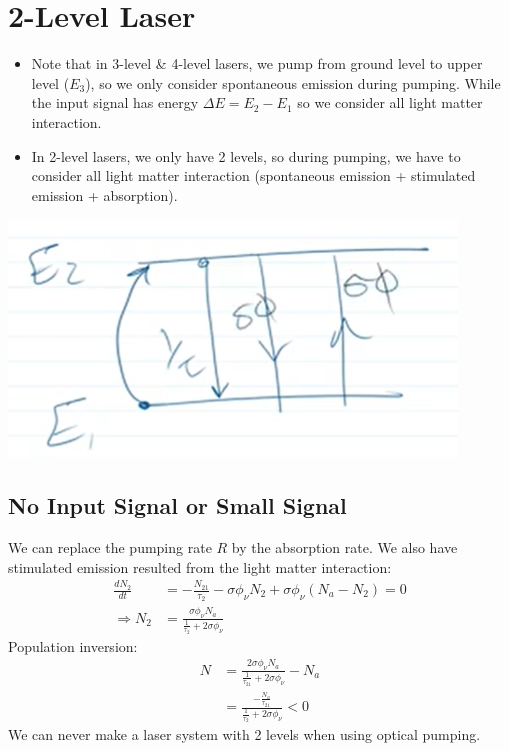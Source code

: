 \documentclass[11pt]{article}
\begin{document}
\section{2-Level Laser}
\begin{minipage}{0.5\textwidth}
    \begin{itemize}
        \item Note that in 3-level \& 4-level lasers, we pump from ground level to upper level ($E_3$), so we only consider spontaneous emission during pumping. While the input signal has energy $\Delta E = E_2 - E_1$ so we consider all light matter interaction. 
        \item In 2-level lasers, we only have 2 levels, so during pumping, we have to consider all light matter interaction (spontaneous emission + stimulated emission + absorption).
    \end{itemize}
\end{minipage}
\begin{minipage}{0.45\textwidth}
    \centering
    \includegraphics[scale=0.7]{2.png}
\end{minipage}
\subsection{No Input Signal or Small Signal}
We can replace the pumping rate $R$ by the absorption rate. We also have stimulated emission resulted from the light matter interaction:
\begin{align*}
    \frac{dN_2}{dt} &= - \frac{N_{21}}{\tau_{2}} - \sigma \phi_{\nu} N_2 + \sigma \phi_{\nu} (N_a - N_2) = 0 \\
    \Rightarrow N_2 &= \frac{\sigma \phi_{\nu} N_a}{\frac{1}{\tau_{2}} + 2\sigma \phi_{\nu}}
\end{align*}
Population inversion:
\begin{align*}
    N &= \frac{2\sigma \phi_{\nu} N_a}{\frac{1}{\tau_{21}} + 2\sigma \phi_{\nu}} - N_a\\
    &= \frac{-\frac{N_a}{\tau_{21}}}{\frac{1}{\tau_{2}} + 2\sigma \phi_{\nu}} < 0
\end{align*}
We can never make a laser system with 2 levels when using optical pumping. 
\end{document}
